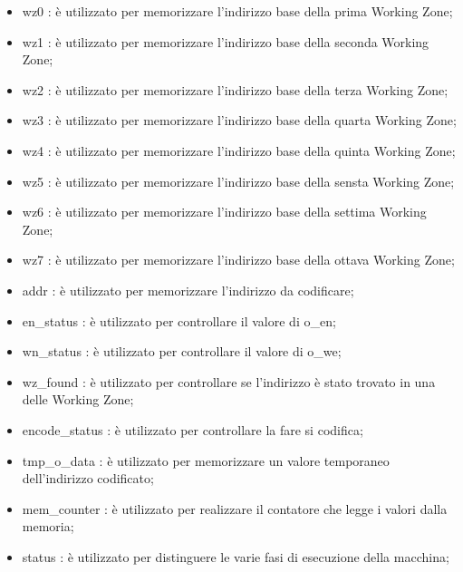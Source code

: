 \documentclass{article}
\begin{document}
\begin{itemize}
\item {\selectfont wz0} : è utilizzato per memorizzare l'indirizzo base della prima Working Zone;
\item {\selectfont wz1} : è utilizzato per memorizzare l'indirizzo base della seconda Working Zone;
\item {\selectfont wz2} : è utilizzato per memorizzare l'indirizzo base della terza Working Zone;
\item {\selectfont wz3} : è utilizzato per memorizzare l'indirizzo base della quarta Working Zone;
\item {\selectfont wz4} : è utilizzato per memorizzare l'indirizzo base della quinta Working Zone;
\item {\selectfont wz5} : è utilizzato per memorizzare l'indirizzo base della sensta Working Zone;
\item {\selectfont wz6} : è utilizzato per memorizzare l'indirizzo base della settima Working Zone;
\item {\selectfont wz7} : è utilizzato per memorizzare l'indirizzo base della ottava Working Zone;
\item {\selectfont addr} : è utilizzato per memorizzare l'indirizzo da codificare;
\item {\selectfont en\_status} : è utilizzato per controllare il valore di {\selectfont o\_en};
\item {\selectfont wn\_status} : è utilizzato per controllare il valore di {\selectfont o\_we};
\item {\selectfont wz\_found} : è utilizzato per controllare se l'indirizzo è stato trovato in una delle Working Zone;
\item {\selectfont encode\_status} : è utilizzato per controllare la fare si codifica;
\item {\selectfont tmp\_o\_data} : è utilizzato per memorizzare un valore temporaneo dell'indirizzo codificato;
\item {\selectfont mem\_counter} : è utilizzato per realizzare il contatore che legge i valori dalla memoria;
\item {\selectfont status} : è utilizzato per distinguere le varie fasi di esecuzione della macchina;
\end{itemize}
\pagebreak
\end{document}
